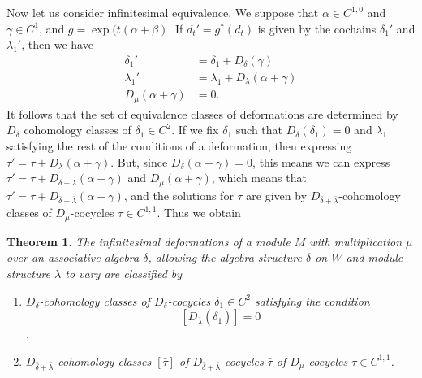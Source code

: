 \documentclass[12pt]{amsart}
\newtheorem{thm}{Theorem}[section]
\theoremstyle{definition}
\begin{document}
Now let us consider infinitesimal equivalence.  We suppose that $\alpha\in C^{1,0}$ and
$\gamma\in C^1$, and $g=\exp(t(\alpha+\beta)$. If $d_t'=g^*({d}_t)$ is given by
the cochains $\delta_1'$ and $\lambda_1'$, then we have
\begin{align*}
\delta_1'&=\delta_1+D_\delta(\gamma)\\
\lambda_1'&=\lambda_1+D_{\lambda}(\alpha+\gamma)\\
D_{\mu}(\alpha+\gamma)&=0.
\end{align*}
It follows that the set of equivalence classes of deformations are determined by
$D_\delta$ cohomology classes of $\delta_1\in C^2$. If we fix $\delta_1$ such that
$D_\delta(\delta_1)=0$ and $\lambda_1$ satisfying the rest of the conditions of a
deformation, then expressing $\tau'=\tau+D_{\lambda}(\alpha+\gamma)$.
But, since $D_\delta(\alpha+\gamma)=0$, this means
we can express $\tau'=\tau+D_{\delta+\lambda}(\alpha+\gamma)$ and $D_\mu(\alpha+\gamma)$,
which means that $\bar\tau'=\bar\tau+D_{\bar\delta+\bar\lambda}(\bar\alpha+\bar\gamma)$, and the solutions
for $\tau$ are given by $D_{\bar\delta+\bar\lambda}$-cohomology classes of
$D_\mu$-cocycles $\tau\in C^{1,1}$.
Thus we obtain
\begin{thm}\label{th9}
The infinitesimal deformations of a module $M$ with multiplication
$\mu$ over an associative algebra $\delta$, allowing the algebra
structure $\delta$ on $W$ and module structure $\lambda$ to vary are
classified by
\begin{enumerate}
\item $D_{\delta}$-cohomology classes of $D_\delta$-cocycles
$\delta_1\in C^2$ satisfying the condition
$$[D_{\bar\lambda}(\bar\delta_1)]=0$$.
\item $D_{\bar\delta+\bar\lambda}$-cohomology classes $[\bar\tau]$ of $D_{\bar\delta+\bar\lambda}$-cocycles $\bar\tau$ of
$D_\mu$-cocycles $\tau\in C^{1,1}$.
\end{enumerate}
\end{thm}
\end{document}
